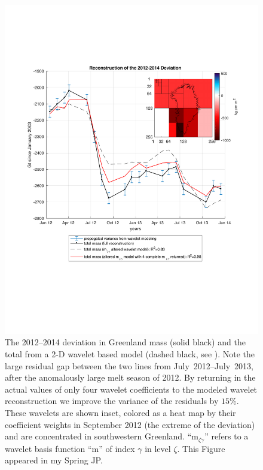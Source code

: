 \documentclass[11pt]{report}
\begin{document}
\begin{figure} 
\includegraphics[width=\linewidth]{Figures/deviant.pdf}
\caption[Location of the 2012--2014 Deviation]{The 2012--2014 deviation in Greenland mass (solid black) and the total from a 2-D wavelet based model (dashed black, see ). Note the large residual gap between the two lines from July~2012--July~2013, after the anomalously large melt season of 2012. By returning in the actual values of only four wavelet coefficients to the modeled wavelet reconstruction we improve the variance of the residuals by $15\%$. These wavelets are shown inset, colored as a heat map by their coefficient weights in September 2012 (the extreme of the deviation) and are concentrated in southwestern Greenland. ``m$_{\zeta\gamma}$'' refers to a wavelet basis function ``m'' of index $\gamma$ in level $\zeta$. This Figure appeared in my Spring JP.
\label{fig:deviant}}
\end{figure}
\end{document}
